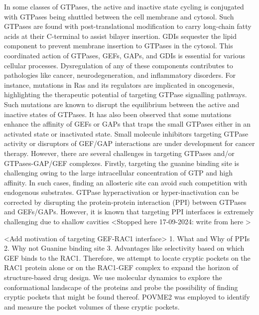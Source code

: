 \documentclass[12pt, a4paper]{achemso}
\begin{document}
    In some classes of GTPases, the active and inactive state cycling is conjugated with GTPases being shuttled between the cell membrane and cytosol. Such GTPases are found with post-translational modification to carry long-chain fatty acids at their C-terminal to assist bilayer insertion. GDIs\cite{dermardirossian2005gdis, maruta1998gtpase} sequester the lipid component to prevent membrane insertion to GTPases in the cytosol. This coordinated action of GTPases, GEFs, GAPs, and GDIs is essential for various cellular processes. Dysregulation of any of these components contributes to pathologies like cancer, neurodegeneration, and inflammatory disorders. For instance, mutations in Ras and its regulators are implicated in oncogenesis, highlighting the therapeutic potential of targeting GTPase signalling pathways\cite{cherfils2013regulation}. Such mutations are known to disrupt the equilibrium between the active and inactive states of GTPases. It has also been observed that some mutations enhance the affinity of GEFs or GAPs that traps the small GTPases either in an activated state or inactivated state. Small molecule inhibitors targeting GTPase activity or disruptors of GEF/GAP interactions\cite{gray2020targeting} are under development for cancer therapy. However, there are several challenges in targeting GTPases and/or GTPases-GAP/GEF complexes. Firstly, targeting the guanine binding site is challenging owing to the large intracellular concentration of GTP and high affinity\cite{traut1994physiological}. In such cases, finding an allosteric site can avoid such competition with endogenous substrates. GTPase hyperactivation or hyper-inactivation can be corrected by disrupting the protein-protein interaction (PPI) between GTPases and GEFs/GAPs. However, it is known that targeting PPI interfaces is extremely challenging due to shallow cavities <Stopped here 17-09-2024: write from here >
   
   
   <Add motivation of targeting GEF-RAC1 interface> 
    1. What and Why of PPIs
    2. Why not Guanine binding site
    3. Advantages like selectivity based on which GEF binds to the RAC1.
   Therefore, we attempt to locate cryptic pockets on the RAC1 protein alone or on the RAC1-GEF complex to expand the horizon of structure-based drug design. We use molecular dynamics to explore the conformational landscape of the proteins and probe the possibility of finding cryptic pockets that might be found thereof. POVME2 was employed to identify and measure the pocket volumes of these cryptic pockets.
\end{document}
